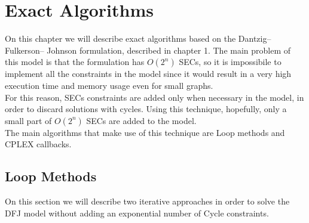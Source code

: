 \chapter{Exact Algorithms}

On this chapter we will describe exact algorithms based on the Dantzig–Fulkerson– Johnson formulation, described in chapter 1. The main problem of this model is that the formulation has $O(2^n)$ SECs, so it is impossibile to implement all the constraints in the model since it would result in a very high execution time and memory usage even for small graphs.
\\ For this reason, SECs constraints are added only when necessary in the model, in order to discard solutions with cycles. Using this technique, hopefully, only a small part of $O(2^n)$ SECs are added to the model.
\\ The main algorithms that make use of this technique are Loop methods and CPLEX callbacks.

\section{Loop Methods}
On this section we will describe two iterative approaches in order to solve the DFJ model without adding an exponential number of Cycle constraints.
